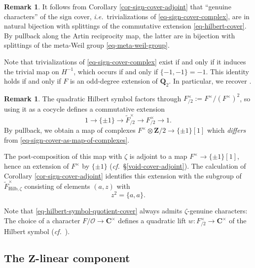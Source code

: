 \documentclass[10pt,english,reqno]{amsart}
\newcommand{\integers}{\mathbf Z}
\newcommand{\rationals}{\mathbf Q}
\newcommand{\complexes}{\mathbf C}
\newcommand{\Hilbert}{\mathrm{Hilb}}
\theoremstyle{definition}
\newtheorem{rem}[subsubsection]{Remark}
\numberwithin{equation}{section}
\begin{document}
\begin{rem}
It follows from Corollary \ref{cor-sign-cover-adjoint} that ``genuine characters'' of the sign cover, \emph{i.e.}~trivializations of \eqref{eq-sign-cover-complex}, are in natural bijection with splittings of the commutative extension \eqref{eq-hilbert-cover}. By pullback along the Artin reciprocity map, the latter are in bijection with splittings of the meta-Weil group \eqref{eq-meta-weil-group}.

Note that trivializations of \eqref{eq-sign-cover-complex} exist if and only if it induces the trivial map on $H^{-1}$, which occurs if and only if $\{-1, -1\} = -1$. This identity holds if and only if $F$ is an odd-degree extension of $\rationals_2$. In particular, we recover \cite[Proposition 4.1, Proposition 4.3]{MR3802418}.
\end{rem}


\begin{rem}
The quadratic Hilbert symbol factors through $F^{\times}_{/2} := F^{\times}/(F^{\times})^2$, so using it as a cocycle defines a commutative extension
\begin{equation}
\label{eq-hilbert-symbol-quotient-cover}
1 \rightarrow \{\pm 1\} \rightarrow \widetilde F^{\times}_{/2} \rightarrow F^{\times}_{/2} \rightarrow 1.
\end{equation}
By pullback, we obtain a map of complexes $F^{\times}\otimes\integers/2 \rightarrow \{\pm 1\}[1]$ which \emph{differs} from \eqref{eq-sign-cover-as-map-of-complexes}.

The post-composition of this map with $\zeta$ is adjoint to a map $F^{\times} \rightarrow \{\pm 1\}[1]$, hence an extension of $F^{\times}$ by $\{\pm 1\}$ (\emph{cf.}~\S\ref{void-cover-adjoint}). The calculation of Corollary \ref{cor-sign-cover-adjoint} identifies this extension with the subgroup of $\widetilde F^{\times}_{\Hilbert, \zeta}$ consisting of elements $(a, z)$ with
$$
z^2 = \{a, a\}.
$$

Note that \eqref{eq-hilbert-symbol-quotient-cover} always admits $\zeta$-genuine characters: The choice of a character $F/\mathscr O \rightarrow \complexes^{\times}$ defines a quadratic lift $w : F^{\times}_{/2} \rightarrow \complexes^{\times}$ of the Hilbert symbol (\emph{cf.}~\cite[\S4.3]{MR3802418}).
\end{rem}

\fi



\subsection{The $\integers$-linear component}
\label{sec-torus-linear-cover}
\end{document}

